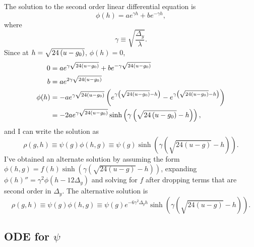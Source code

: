 \documentclass[]{article}
\begin{document}
The solution to the second order linear differential equation is
\begin{equation*}
  \phi(h) = a e^{\gamma h} + b e^{-\gamma h},
\end{equation*}
where
\begin{equation*}
  \gamma \equiv \sqrt{\frac{\Delta_y}{\lambda}}.
\end{equation*}
Since at $h = \sqrt{24\left(u-g_0\right)}$, $\phi(h) = 0$,
\begin{align*}
  0 &= a e^{\gamma \sqrt{24\left(u-g_0\right)}} + b e^{-\gamma \sqrt{24\left(u-g_0\right)}} \\
  b &= a e^{2\gamma \sqrt{24\left(u-g_0\right)}} \\
  \phi(h) &= -a e^{\gamma \sqrt{24\left(u-g_0\right)}} \left(
    e^{\gamma \left( \sqrt{24\left(u-g_0\right)} - h \right) } -
    e^{\gamma \left(\sqrt{24\left(u-g_0\right)} - h \right) } \right) \\
  &= -2 a e^{\gamma \sqrt{24\left(u-g_0\right)}} \sinh \left( \gamma \left( \sqrt{24\left(u-g_0\right)}
      - h \right) \right),
\end{align*}
and I can write the solution as
\newcommand{\phiHG}[2]{\sinh \left( \gamma \left( \sqrt{24(u-#2)} - #1
    \right) \right)}
\begin{equation}
  \label{eq:sol_h}
  \rho(g,h) \equiv \psi(g) \phi(h,g) \equiv \psi(g) \phiHG{h}{g}.
\end{equation}
\newcommand{\altphiHG}[2]{e^{-6\gamma^2 \Delta_y h} \sinh \left( \gamma
    \left( \sqrt{24(u-#2)} - #1 \right) \right)} I've obtained an
alternate solution by assuming the form $\phi(h,g) = f(h) \sinh\left(
  \gamma \left( \sqrt{24(u-g)} - h \right) \right)$, expanding
$\phi(h)'' = \gamma^2 \phi(h - 12\Delta_y)$ and solving for $f$ after
dropping terms that are second order in $\Delta_y$.  The alternative
solution is
\begin{equation}
  \label{eq:sol_h_}
  \rho(g,h) \equiv \psi(g) \phi(h,g) \equiv \psi(g) \altphiHG{h}{g}.  
\end{equation}

\subsection{ODE for $\psi$}
\label{sec:ODE}
\end{document}

